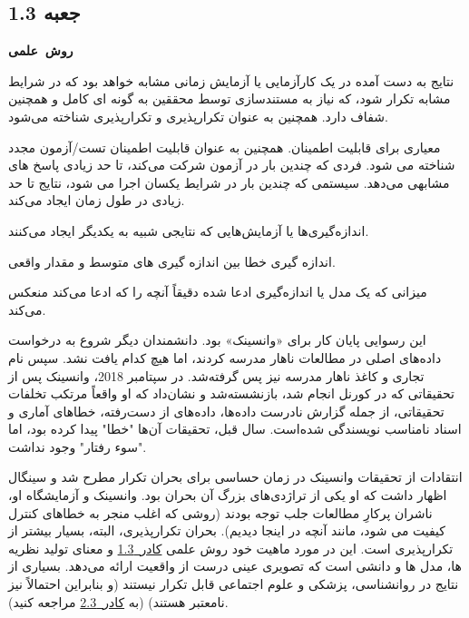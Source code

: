 \begin{tcolorbox}[colback=gray!10,colframe=black]

    \section*{جعبه 1.3}
    \label{sec:جعبه 1.3}
    \begin{Large}
        \textbf{\mbox{روش علمی}}
    \end{Large}
    \newline

    \begin{description}[leftmargin=0.5cm,style=nextline]
        \item[تکرارپذیری:] نتایج به دست آمده در یک کارآزمایی یا آزمایش زمانی مشابه خواهد بود که در شرایط مشابه تکرار شود، که نیاز به مستندسازی توسط محققین به گونه ای کامل و همچنین شفاف دارد.
        همچنین به عنوان تکرارپذیری و تکرارپذیری شناخته می‌شود.
        \item[قابلیت اطمینان:] معیاری برای قابلیت اطمینان.
        همچنین به عنوان قابلیت اطمینان تست/آزمون مجدد شناخته می شود.
        فردی که چندین بار در آزمون شرکت می‌کند، تا حد زیادی پاسخ های مشابهی می‌دهد.
        سیستمی که چندین بار در شرایط یکسان اجرا می شود، نتایج تا حد زیادی در طول زمان ایجاد می‌کند.
        \item[دقت:] اندازه‌گیری‌ها یا آزمایش‌هایی که نتایجی شبیه به یکدیگر ایجاد می‌کنند.
        \item[صحت:] اندازه گیری خطا بین اندازه گیری های متوسط و مقدار واقعی.
        \item[اعتبار:] میزانی که یک مدل یا اندازه‌گیری ادعا شده دقیقاً آنچه را که ادعا می‌کند منعکس می‌کند.
    \end{description}


\end{tcolorbox}


این رسوایی پایان کار برای «وانسینک» بود.
دانشمندان دیگر شروع به درخواست داده‌های اصلی در مطالعات ناهار مدرسه کردند، اما هیچ کدام یافت نشد.
سپس نام تجاری و کاغذ ناهار مدرسه نیز پس گرفته‌شد.
در سپتامبر 2018، وانسینک پس از تحقیقاتی که در کورنل انجام شد، بازنشسته‌شد و نشان‌داد که او واقعاً مرتکب تخلفات تحقیقاتی، از جمله گزارش نادرست داده‌ها، داده‌های از دست‌رفته، خطاهای آماری و اسناد نامناسب نویسندگی شده‌است.
سال قبل، تحقیقات آن‌ها "خطا" پیدا کرده بود، اما "سوء رفتار" وجود نداشت.

انتقادات از تحقیقات وانسینک در زمان حساسی برای بحران تکرار مطرح شد و سینگال اظهار داشت که او یکی از تراژدی‌های بزرگ آن بحران بود.
وانسینک و آزمایشگاه او، ناشران پرکارِ مطالعات جلب توجه بودند (روشی که اغلب منجر به خطاهای کنترل کیفیت می شود، مانند آنچه در اینجا دیدیم).
بحران تکرارپذیری، البته، بسیار بیشتر از تکرارپذیری است.
این در مورد ماهیت خود روش علمی \hyperref[sec:جعبه 1.3]{\mbox{کادر 1.3}} و معنای تولید نظریه ها، مدل ها و دانشی است که تصویری عینی درست از واقعیت ارائه می‌دهد.
بسیاری از نتایج در روانشناسی، پزشکی و علوم اجتماعی قابل تکرار نیستند (و بنابراین احتمالاً نیز نامعتبر هستند) (به \hyperref[sec:جعبه 2.3]{\mbox{کادر 2.3}} مراجعه کنید).

